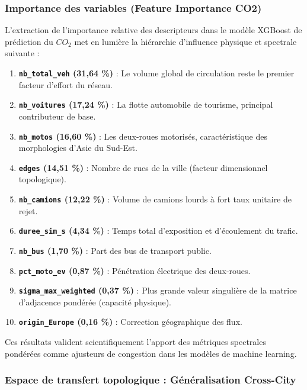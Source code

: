 \documentclass[10pt, a4paper]{article}
\providecommand{\tightlist}{}
\begin{document}
\subsubsection{Importance des variables (Feature Importance
CO2)}\label{importance-des-variables-feature-importance-co2}

L'extraction de l'importance relative des descripteurs dans le modèle
XGBoost de prédiction du \(CO_2\) met en lumière la hiérarchie
d'influence physique et spectrale suivante :

\begin{enumerate}
\def\labelenumi{\arabic{enumi}.}
\tightlist
\item
  \textbf{\texttt{nb\_total\_veh} (31,64 \%)} : Le volume global de
  circulation reste le premier facteur d'effort du réseau.
\item
  \textbf{\texttt{nb\_voitures} (17,24 \%)} : La flotte automobile de
  tourisme, principal contributeur de base.
\item
  \textbf{\texttt{nb\_motos} (16,60 \%)} : Les deux-roues motorisés,
  caractéristique des morphologies d'Asie du Sud-Est.
\item
  \textbf{\texttt{edges} (14,51 \%)} : Nombre de rues de la ville
  (facteur dimensionnel topologique).
\item
  \textbf{\texttt{nb\_camions} (12,22 \%)} : Volume de camions lourds à
  fort taux unitaire de rejet.
\item
  \textbf{\texttt{duree\_sim\_s} (4,34 \%)} : Temps total d'exposition
  et d'écoulement du trafic.
\item
  \textbf{\texttt{nb\_bus} (1,70 \%)} : Part des bus de transport
  public.
\item
  \textbf{\texttt{pct\_moto\_ev} (0,87 \%)} : Pénétration électrique des
  deux-roues.
\item
  \textbf{\texttt{sigma\_max\_weighted} (0,37 \%)} : Plus grande valeur
  singulière de la matrice d'adjacence pondérée (capacité physique).
\item
  \textbf{\texttt{origin\_Europe} (0,16 \%)} : Correction géographique
  des flux.
\end{enumerate}

Ces résultats valident scientifiquement l'apport des métriques
spectrales pondérées comme ajusteurs de congestion dans les modèles de
machine learning.

\subsubsection{Espace de transfert topologique : Généralisation
Cross-City}\label{espace-de-transfert-topologique-guxe9nuxe9ralisation-cross-city}
\end{document}
